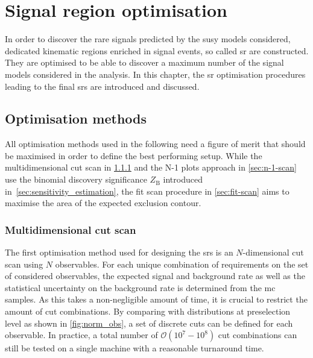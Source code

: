 

\chapter{Signal region optimisation}\label{ch:signal_region_optimisation}

\ifpdf
    \graphicspath{{chapter-optimisation/Figs/Raster/}{chapter-optimisation/Figs/PDF/}{chapter-optimisation/Figs/}}
\else
    \graphicspath{{chapter-optimisation/Figs/Vector/}{chapter-optimisation/Figs/}}
\fi


In order to discover the rare signals predicted by the \gls{susy} models considered, dedicated kinematic regions enriched in signal events, so called \gls{sr} are constructed. They are optimised to be able to discover a maximum number of the signal models considered in the analysis. In this chapter, the \gls{sr} optimisation procedures leading to the final \glspl{sr} are introduced and discussed. 

\section{Optimisation methods}

All optimisation methods used in the following need a figure of merit that should be maximised in order to define the best performing setup. While the multidimensional cut scan in \cref{sec:n-dim-scan} and the N-1 plots approach in \cref{sec:n-1-scan} use the binomial discovery significance $Z_\mathrm{B}$ introduced in~\cref{sec:sensitivity_estimation}, the fit scan procedure in \cref{sec:fit-scan} aims to maximise the area of the expected exclusion contour.

\subsection{Multidimensional cut scan}\label{sec:n-dim-scan}

The first optimisation method used for designing the \glspl{sr} is an $N$-dimensional cut scan using $N$ observables. For each unique combination of requirements on the set of considered observables, the expected signal and background rate as well as the statistical uncertainty on the background rate is determined from the \gls{mc} samples. As this takes a non-negligible amount of time, it is crucial to restrict the amount of cut combinations. By comparing with distributions at preselection level as \eg shown in \cref{fig:norm_obs}, a set of discrete cuts can be defined for each observable. In practice, a total number of $\mathcal{O}(10^7-10^8)$ cut combinations can still be tested on a single machine with a reasonable turnaround time. 

